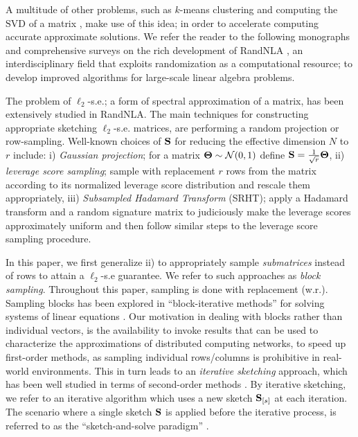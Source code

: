 \documentclass[journal,letterpaper,onecolumn,twoside,nofonttune]{IEEEtran}
\newcommand{\Nn}{\mathcal{N}}
\newcommand{\Sb}{\bold{S}}
\newcommand{\Thb}{\bold{\Theta}}
\newcommand{\SVD}{\mathrm{SVD}}
\begin{document}
A multitude of other problems, such as $k$-means clustering \cite{BZMD14,CEMMP15,Cha20} and computing the $\SVD$ of a matrix \cite{DFKVV99,DFKVV04,DKM06a,DKM06b}, make use of this idea; in order to accelerate computing accurate approximate solutions. We refer the reader to the following monographs and comprehensive surveys on the rich development of RandNLA \cite{HMJ11,Mah12,Mah16,MM20,Wan15,Woo14,DM16}, an interdisciplinary field that exploits randomization as a computational resource; to develop improved algorithms for large-scale linear algebra problems.

The problem of $\ell_2$-s.e.; a form of spectral approximation of a matrix, has been extensively studied in RandNLA. The main techniques for constructing appropriate sketching $\ell_2$-s.e. matrices, are performing a random projection or row-sampling. Well-known choices of $\Sb$ for reducing the effective dimension $N$ to $r$ include: i) \textit{Gaussian projection}; for a matrix $\Thb\sim\Nn(0,1)$ define $\Sb=\frac{1}{\sqrt{r}}\Thb$, ii) \textit{leverage score sampling}; sample with replacement $r$ rows from the matrix according to its normalized leverage score distribution and rescale them appropriately, iii) \textit{Subsampled Hadamard Transform} (SRHT); apply a Hadamard transform and a random signature matrix to judiciously make the leverage scores approximately uniform and then follow similar steps to the leverage score sampling procedure.

In this paper, we first generalize ii) to appropriately sample \textit{submatrices} instead of rows to attain a $\ell_2$-s.e guarantee. We refer to such approaches as \textit{block sampling}. Throughout this paper, sampling is done with replacement (w.r.). Sampling blocks has been explored in ``block-iterative methods'' for solving systems of linear equations \cite{Elf80,Gut06,NT14,RN20}. Our motivation in dealing with blocks rather than individual vectors, is the availability to invoke results that can be used to characterize the approximations of distributed computing networks, to speed up first-order methods, as sampling individual rows/columns is prohibitive in real-world environments. This in turn leads to an \textit{iterative sketching} approach, which has been well studied in terms of second-order methods \cite{PW16,PW17,LLDP20}. By iterative sketching, we refer to an iterative algorithm which uses a new sketch $\Sb_{[s]}$ at each iteration. The scenario where a single sketch $\Sb$ is applied before the iterative process, is referred to as the ``sketch-and-solve paradigm'' \cite{Sar06}.
\end{document}

